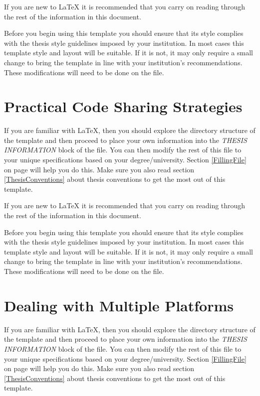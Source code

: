 If you are new to \LaTeX{} it is recommended that you carry on reading through the rest of the information in this document.

Before you begin using this template you should ensure that its style complies with the thesis style guidelines imposed by your institution. In most cases this template style and layout will be suitable. If it is not, it may only require a small change to bring the template in line with your institution's recommendations. These modifications will need to be done on the  file.

\section{Practical Code Sharing Strategies}

If you are familiar with \LaTeX{}, then you should explore the directory structure of the template and then proceed to place your own information into the \emph{THESIS INFORMATION} block of the  file. You can then modify the rest of this file to your unique specifications based on your degree/university. Section \ref{FillingFile} on page \pageref{FillingFile} will help you do this. Make sure you also read section \ref{ThesisConventions} about thesis conventions to get the most out of this template.

If you are new to \LaTeX{} it is recommended that you carry on reading through the rest of the information in this document.

Before you begin using this template you should ensure that its style complies with the thesis style guidelines imposed by your institution. In most cases this template style and layout will be suitable. If it is not, it may only require a small change to bring the template in line with your institution's recommendations. These modifications will need to be done on the  file.

\section{Dealing with Multiple Platforms}

If you are familiar with \LaTeX{}, then you should explore the directory structure of the template and then proceed to place your own information into the \emph{THESIS INFORMATION} block of the  file. You can then modify the rest of this file to your unique specifications based on your degree/university. Section \ref{FillingFile} on page \pageref{FillingFile} will help you do this. Make sure you also read section \ref{ThesisConventions} about thesis conventions to get the most out of this template.


